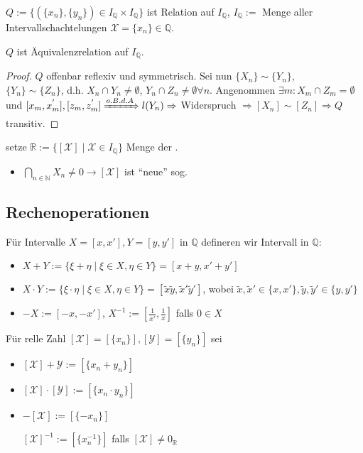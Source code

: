 \begin{*definition}
	$Q:=\{ (\{x_n\}, \{y_n\})\in I_\mathbb{Q}\times I_\mathbb{Q} \}$ ist Relation auf $I_\mathbb{Q}$, $I_\mathbb{Q}:=$ Menge aller Intervallschachtelungen $\mathcal{X}=\{x_n\} \in \mathbb{Q}$.
\end{*definition}

\begin{proposition}
	$Q$ ist Äquivalenzrelation auf $I_\mathbb{Q}$.
\end{proposition}

\begin{proof}
	$Q$ offenbar reflexiv und symmetrisch. Sei nun $\{X_n\} \sim \{Y_n\}$, \\
	$\{Y_n\} \sim \{Z_n\}$, d.h. $X_n \cap Y_n \neq \emptyset$, $Y_n \cap Z_n \neq \emptyset \forall n$.
	Angenommen $\exists m: X_m \cap Z_m = \emptyset$  und $[x_m, x_m^{'}], [z_m,z_m^{'}] \xRightarrow{o.B.d.A} l(Y_n) \Rightarrow$ Widerspruch $\Rightarrow [X_n] \sim [Z_n] \Rightarrow Q$ transitiv.
\end{proof}

\begin{*definition}
	setze $\mathbb{R} := \{ [\mathcal{X}] \mid \mathcal{X}\in I_\mathbb{Q} \}$ Menge der .
	
	\begin{itemize}
		\item $\bigcap_{n\in\mathbb{N}} X_n \neq 0 \rightarrow [\mathcal{X}]$ ist "`neue"' sog. 
	\end{itemize}
\end{*definition}

\subsection{Rechenoperationen}
\begin{*definition}
	Für Intervalle $X=[x,x'], Y=[y,y']$ in $\mathbb{Q}$ defineren wir Intervall in $\mathbb{Q}$:
	\begin{itemize}
		\item $X + Y := \{\xi + \eta \mid \xi \in X, \eta\in Y\} = [x + y, x' + y']$
		\item $X\cdot Y :=\{\xi \cdot \eta \mid \xi \in X, \eta\in Y\} = [\tilde{x}\tilde{y}, \tilde{x}'\tilde{y}']$, wobei $\tilde{x},\tilde{x}'\in\{x,x'\},\tilde{y},\tilde{y}'\in\{y,y'\}$
		\item $-X := [-x,-x']$, $X^{-1}:=[\frac{1}{x'}, \frac{1}{x}]$ falls $0\in X$
	\end{itemize}

	Für relle Zahl $[\mathcal{X}] = [\{x_n\}], [\mathcal{Y}]=[\{y_n\}]$ sei
	\begin{itemize}
		\item $[\mathcal{X}]+\mathcal{Y} :=[\{x_n + y_n\}]$
		\item $[\mathcal{X}]\cdot[\mathcal{Y}] :=[\{x_n\cdot y_n\}]$
		\item $-[\mathcal{X}]:=[\{-x_n\}]$
			
			$[\mathcal{X}]^{-1} := [\{x_n^{-1}\}]$ falls $[\mathcal{X}]\neq 0_\mathbb{R}$
	\end{itemize}
\end{*definition}

